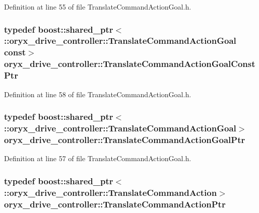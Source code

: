 \-Definition at line 55 of file \-Translate\-Command\-Action\-Goal.\-h.

\subsubsection[{\-Translate\-Command\-Action\-Goal\-Const\-Ptr}]{\setlength{\rightskip}{0pt plus 5cm}typedef boost\-::shared\-\_\-ptr$<$ \-::{\bf oryx\-\_\-drive\-\_\-controller\-::\-Translate\-Command\-Action\-Goal} const$>$ {\bf oryx\-\_\-drive\-\_\-controller\-::\-Translate\-Command\-Action\-Goal\-Const\-Ptr}}\label{namespaceoryx__drive__controller_a5093874aecb76071efec106107ee5a62}


\-Definition at line 58 of file \-Translate\-Command\-Action\-Goal.\-h.

\subsubsection[{\-Translate\-Command\-Action\-Goal\-Ptr}]{\setlength{\rightskip}{0pt plus 5cm}typedef boost\-::shared\-\_\-ptr$<$ \-::{\bf oryx\-\_\-drive\-\_\-controller\-::\-Translate\-Command\-Action\-Goal}$>$ {\bf oryx\-\_\-drive\-\_\-controller\-::\-Translate\-Command\-Action\-Goal\-Ptr}}\label{namespaceoryx__drive__controller_a1ebe17adb1cda70f24ed4948e05ef83a}


\-Definition at line 57 of file \-Translate\-Command\-Action\-Goal.\-h.

\subsubsection[{\-Translate\-Command\-Action\-Ptr}]{\setlength{\rightskip}{0pt plus 5cm}typedef boost\-::shared\-\_\-ptr$<$ \-::{\bf oryx\-\_\-drive\-\_\-controller\-::\-Translate\-Command\-Action}$>$ {\bf oryx\-\_\-drive\-\_\-controller\-::\-Translate\-Command\-Action\-Ptr}}\label{namespaceoryx__drive__controller_a06ee5b4c4ce8bbdb055eb0d7d1322c08}


